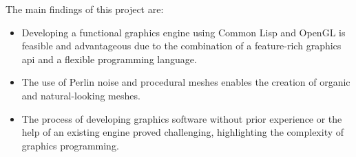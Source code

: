 \label{SEC:SUMMARY}

The main findings of this project are:

\begin{itemize}
\item Developing a functional graphics engine using Common Lisp and OpenGL is feasible and advantageous due to the combination of a feature-rich graphics \ac{api} and a flexible programming language.
\item The use of Perlin noise and procedural meshes enables the creation of organic and natural-looking meshes.
\item The process of developing graphics software without prior experience or the help of an existing engine proved challenging,
  highlighting the complexity of graphics programming.
\end{itemize}
